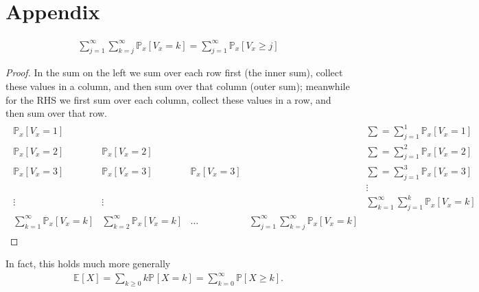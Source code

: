 \chapter{Appendix}
\begin{lemma}[]
\begin{align}
\sum_{j=1}^{\infty} \sum_{k=j}^{\infty} \mathbb{P}_{x} \left[ V_x = k \right] = \sum_{j=1}^{\infty} \mathbb{P}_{x} \left[ V_x \geq j \right]  	
\end{align}
\end{lemma}
\begin{proof}
	In the sum on the left we sum over each row first (the inner sum), collect these values in a column, and then sum over that column (outer sum); meanwhile for the RHS we first sum over each column, collect these values in a row, and then sum over that row.	
	\begin{align}
	\begin{matrix}
	\mathbb{P}_{x} \left[ V_x = 1 \right] & & & & \sum=\sum_{j=1}^{1} \mathbb{P}_{x} \left[ V_x =1 \right]  \\
	\mathbb{P}_{x} \left[ V_x = 2 \right] & \mathbb{P}_{x} \left[ V_x =2 \right] & & & \sum = \sum_{j=1}^{2} \mathbb{P}_{x} \left[ V_x = 2 \right]  \\
	\mathbb{P}_{x} \left[ V_x = 3 \right] & \mathbb{P}_{x} \left[ V_x =3 \right] &  \mathbb{P}_{x} \left[ V_x=3 \right] & & \sum = \sum_{j=1}^{3} \mathbb{P}_{x} \left[ V_x =3 \right]  \\
	& & & & \vdots \\ 
	\vdots & \vdots & & & \sum_{k=1}^{\infty} \sum_{j=1}^{k} \mathbb{P}_{x} \left[ V_x = k \right] \\
	\sum_{k=1}^{\infty} \mathbb{P}_{x} \left[ V_x =k \right] & \sum_{k=2}^{\infty} \mathbb{P}_{x} \left[ V_x=k \right]  &  \ldots  & \sum_{j=1}^{\infty} \sum_{k=j}^{\infty} \mathbb{P}_{x} \left[ V_x = k \right]  
	\end{matrix}
	\end{align}
\end{proof}

\begin{rmk}[]
	In fact, this holds much more generally
\begin{align}
	\mathbb{E}_{} \left[ X \right] = \sum_{k\geq 0}^{} k \mathbb{P}_{} \left[ X=k \right] = \sum_{k=0}^{\infty} \mathbb{P} \left[X \geq k  \right] 
.\end{align}
\end{rmk}

